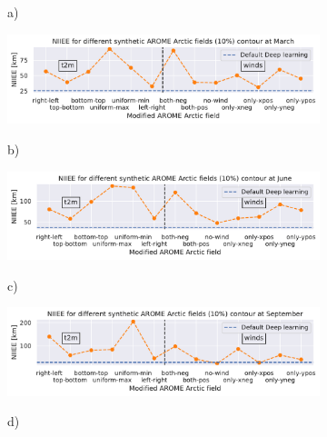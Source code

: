 \documentclass[../main/thesis.tex]{subfiles}
\begin{document}
\begin{figure}
    \centering
    \begin{subfigure}[t]{.015\textwidth}
        a)
    \end{subfigure}
    \begin{subfigure}[t]{0.975\textwidth}
        \includegraphics[width=\textwidth, valign = t]{NIIEE_03.pdf}
    \end{subfigure}
    \begin{subfigure}[t]{.015\textwidth}
        b)
    \end{subfigure}
    \begin{subfigure}[t]{0.975\textwidth}
        \includegraphics[width=\textwidth, valign = t]{NIIEE_06.pdf}
    \end{subfigure}
    \begin{subfigure}[t]{.015\textwidth}
        c)
    \end{subfigure}
    \begin{subfigure}[t]{0.975\textwidth}
        \includegraphics[width=\textwidth, valign = t]{NIIEE_09.pdf}
    \end{subfigure}
    \begin{subfigure}[t]{.015\textwidth}
        d)
    \end{subfigure}
    \begin{subfigure}[t]{0.975\textwidth}

\end{subfigure}
\end{figure}
\end{document}
